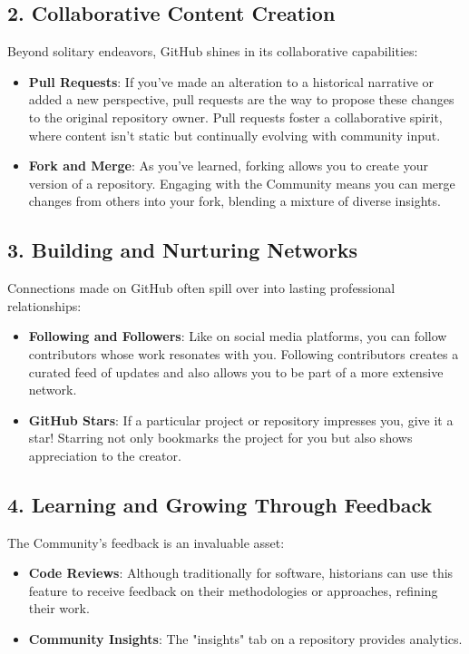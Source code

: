\documentclass{book}
\begin{document}
\subsection*{2. Collaborative Content Creation}
Beyond solitary endeavors, GitHub shines in its collaborative capabilities:

\begin{itemize}
    \item \textbf{Pull Requests}: If you've made an alteration to a historical narrative or added a new perspective, pull requests are the way to propose these changes to the original repository owner. Pull requests foster a collaborative spirit, where content isn't static but continually evolving with community input.
    \item \textbf{Fork and Merge}: As you've learned, forking allows you to create your version of a repository. Engaging with the Community means you can merge changes from others into your fork, blending a mixture of diverse insights.
\end{itemize}

\subsection*{3. Building and Nurturing Networks}
Connections made on GitHub often spill over into lasting professional relationships:

\begin{itemize}
    \item \textbf{Following and Followers}: Like on social media platforms, you can follow contributors whose work resonates with you. Following contributors creates a curated feed of updates and also allows you to be part of a more extensive network.
    \item \textbf{GitHub Stars}: If a particular project or repository impresses you, give it a star! Starring not only bookmarks the project for you but also shows appreciation to the creator.
\end{itemize}

\subsection*{4. Learning and Growing Through Feedback}
The Community's feedback is an invaluable asset:

\begin{itemize}
    \item \textbf{Code Reviews}: Although traditionally for software, historians can use this feature to receive feedback on their methodologies or approaches, refining their work.
    \item \textbf{Community Insights}: The "insights" tab on a repository provides analytics. 
\end{itemize}
\end{document}
